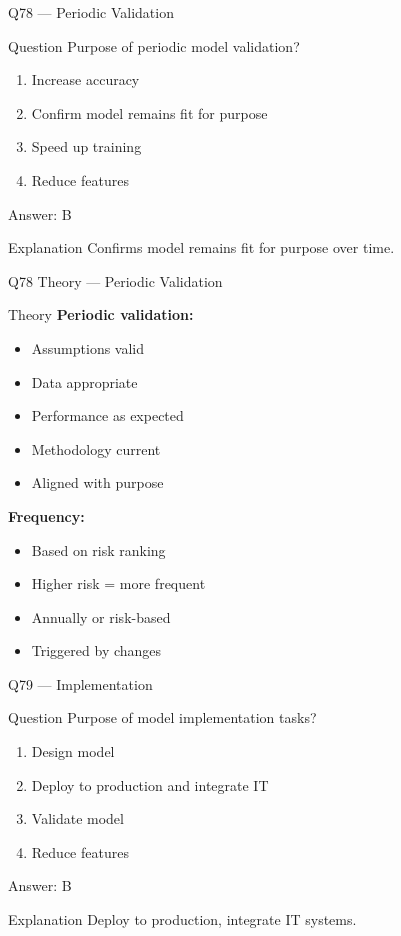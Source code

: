 \documentclass[aspectratio=169,8pt]{beamer}
\begin{document}
	\begin{frame}{Q78 --- Periodic Validation}
		\begin{block}{Question}
			Purpose of periodic model validation?
		\end{block}
		\begin{enumerate}[label=\Alph*.]
			\item Increase accuracy
			\item Confirm model remains fit for purpose
			\item Speed up training
			\item Reduce features
		\end{enumerate}
		\begin{exampleblock}{Answer: B}
		\end{exampleblock}
		\begin{block}{Explanation}
			Confirms model remains fit for purpose over time.
		\end{block}
	\end{frame}
	
	\begin{frame}{Q78 Theory --- Periodic Validation}
		\begin{block}{Theory}
			\textbf{Periodic validation:}
			\begin{itemize}
				\item Assumptions valid
				\item Data appropriate
				\item Performance as expected
				\item Methodology current
				\item Aligned with purpose
			\end{itemize}
			\textbf{Frequency:}
			\begin{itemize}
				\item Based on risk ranking
				\item Higher risk = more frequent
				\item Annually or risk-based
				\item Triggered by changes
			\end{itemize}
		\end{block}
	\end{frame}
	
	\begin{frame}{Q79 --- Implementation}
		\begin{block}{Question}
			Purpose of model implementation tasks?
		\end{block}
		\begin{enumerate}[label=\Alph*.]
			\item Design model
			\item Deploy to production and integrate IT
			\item Validate model
			\item Reduce features
		\end{enumerate}
		\begin{exampleblock}{Answer: B}
		\end{exampleblock}
		\begin{block}{Explanation}
			Deploy to production, integrate IT systems.
		\end{block}
	\end{frame}
	
\end{document}

